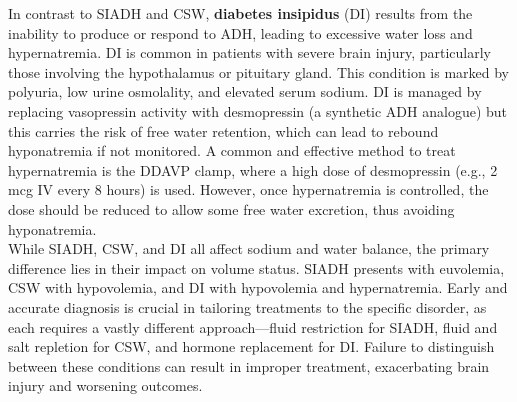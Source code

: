 In contrast to SIADH and CSW, \textbf {diabetes insipidus} (DI) results from the inability to produce or respond to ADH, leading to excessive water loss and hypernatremia. DI is common in patients with severe brain injury, particularly those involving the hypothalamus or pituitary gland. This condition is marked by polyuria, low urine osmolality, and elevated serum sodium. DI is managed by replacing vasopressin activity with desmopressin (a synthetic ADH analogue) but this  carries the risk of free water retention, which can lead to rebound hyponatremia if not  monitored. A common and effective method to treat hypernatremia is the DDAVP clamp, where a high dose of desmopressin (e.g., 2 mcg IV every 8 hours) is used. However, once hypernatremia is controlled, the dose should be reduced to allow some free water excretion, thus avoiding hyponatremia\cite{macmillanDesmopressinPreventRapid2015}.\\

While SIADH, CSW, and DI all affect sodium and water balance, the primary difference lies in their impact on volume status. SIADH presents with euvolemia, CSW with hypovolemia, and DI with hypovolemia and hypernatremia. Early and accurate diagnosis is crucial in tailoring treatments to the specific disorder, as each requires a vastly different approach—fluid restriction for SIADH, fluid and salt repletion for CSW, and hormone replacement for DI. Failure to distinguish between these conditions can result in improper treatment, exacerbating brain injury and worsening outcomes.

